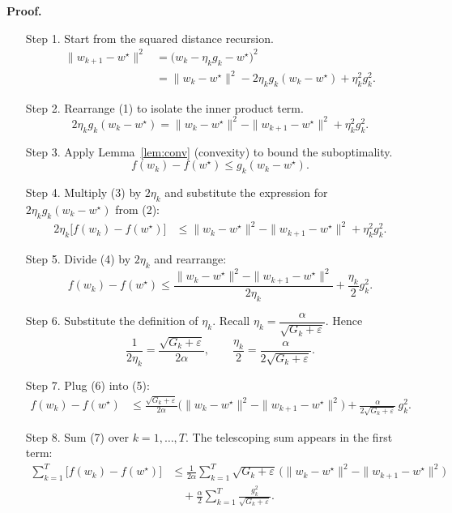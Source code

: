 \documentclass{article}
\begin{document}
\noindent\textbf{Proof.}
\begin{enumerate}
\item[Step 1.] Start from the squared distance recursion.
\[
\begin{aligned}
\|w_{k+1}-w^{\star}\|^{2}
&= \bigl(w_{k}-\eta_{k}g_{k}-w^{\star}\bigr)^{2} \\
&= \|w_{k}-w^{\star}\|^{2}
      -2\eta_{k}g_{k}(w_{k}-w^{\star})
      +\eta_{k}^{2}g_{k}^{2}. \tag{1}
\end{aligned}
\]

\item[Step 2.] Rearrange (1) to isolate the inner product term.
\[
2\eta_{k}g_{k}(w_{k}-w^{\star})
= \|w_{k}-w^{\star}\|^{2}-\|w_{k+1}-w^{\star}\|^{2}
   +\eta_{k}^{2}g_{k}^{2}. \tag{2}
\]

\item[Step 3.] Apply Lemma~\ref{lem:conv} (convexity) to bound the suboptimality.
\[
f(w_{k})-f(w^{\star})\le g_{k}(w_{k}-w^{\star}). \tag{3}
\]

\item[Step 4.] Multiply (3) by $2\eta_{k}$ and substitute the expression for
$2\eta_{k}g_{k}(w_{k}-w^{\star})$ from (2):
\[
\begin{aligned}
2\eta_{k}\bigl[f(w_{k})-f(w^{\star})\bigr]
&\le \|w_{k}-w^{\star}\|^{2}
      -\|w_{k+1}-w^{\star}\|^{2}
      +\eta_{k}^{2}g_{k}^{2}. \tag{4}
\end{aligned}
\]

\item[Step 5.] Divide (4) by $2\eta_{k}$ and rearrange:
\[
f(w_{k})-f(w^{\star})
\le \frac{\|w_{k}-w^{\star}\|^{2}-\|w_{k+1}-w^{\star}\|^{2}}{2\eta_{k}}
     +\frac{\eta_{k}}{2}g_{k}^{2}. \tag{5}
\]

\item[Step 6.] Substitute the definition of $\eta_{k}$.
Recall $\eta_{k}= \dfrac{\alpha}{\sqrt{G_{k}+\varepsilon}}$.
Hence
\[
\frac{1}{2\eta_{k}}
= \frac{\sqrt{G_{k}+\varepsilon}}{2\alpha},
\qquad
\frac{\eta_{k}}{2}
= \frac{\alpha}{2\sqrt{G_{k}+\varepsilon}} .
\tag{6}
\]

\item[Step 7.] Plug (6) into (5):
\[
\begin{aligned}
f(w_{k})-f(w^{\star})
&\le
\frac{\sqrt{G_{k}+\varepsilon}}{2\alpha}
      \bigl(\|w_{k}-w^{\star}\|^{2}-\|w_{k+1}-w^{\star}\|^{2}\bigr)
   +\frac{\alpha}{2\sqrt{G_{k}+\varepsilon}}\,g_{k}^{2}. \tag{7}
\end{aligned}
\]

\item[Step 8.] Sum (7) over $k=1,\dots,T$.
The telescoping sum appears in the first term:
\[
\begin{aligned}
\sum_{k=1}^{T}\bigl[f(w_{k})-f(w^{\star})\bigr]
&\le
\frac{1}{2\alpha}
\sum_{k=1}^{T}
\sqrt{G_{k}+\varepsilon}\,
\bigl(\|w_{k}-w^{\star}\|^{2}-\|w_{k+1}-w^{\star}\|^{2}\bigr)
\\
&\quad
+\frac{\alpha}{2}
\sum_{k=1}^{T}
\frac{g_{k}^{2}}{\sqrt{G_{k}+\varepsilon}} . \tag{8}
\end{aligned}
\]


\end{enumerate}
\end{document}
